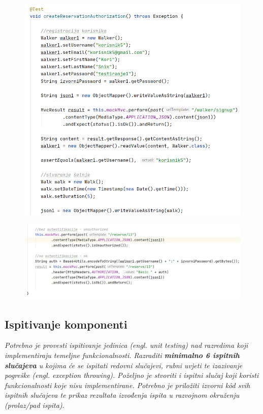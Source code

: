  			
 			\begin{figure}[H]
 				\hspace*{-0.10in}
 				\includegraphics[scale=0.75]{slike/walker4.1.PNG} %
 				\centering
 			\end{figure}
 			\begin{figure}[H]
 				\hspace*{-0.9in}
 				\includegraphics[scale=0.75]{slike/walker4.2.PNG} %
 				\centering
 			\end{figure}
	
			
			\subsection{Ispitivanje komponenti}
			\textit{Potrebno je provesti ispitivanje jedinica (engl. unit testing) nad razredima koji implementiraju temeljne funkcionalnosti. Razraditi \textbf{minimalno 6 ispitnih slučajeva} u kojima će se ispitati redovni slučajevi, rubni uvjeti te izazivanje pogreške (engl. exception throwing). Poželjno je stvoriti i ispitni slučaj koji koristi funkcionalnosti koje nisu implementirane. Potrebno je priložiti izvorni kôd svih ispitnih slučajeva te prikaz rezultata izvođenja ispita u razvojnom okruženju (prolaz/pad ispita). }
			
